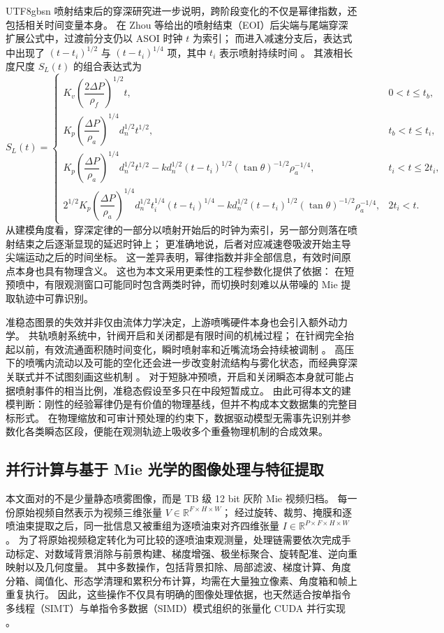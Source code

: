 \documentclass[english, 12pt, a4paper, elec, utf8, a-2b, online]{aaltothesis}
\begin{document}
\begin{CJK*}{UTF8}{gbsn}
喷射结束后的穿深研究进一步说明，跨阶段变化的不仅是幂律指数，还包括相关时间变量本身。
在 Zhou 等给出的喷射结束（EOI）后尖端与尾端穿深扩展公式中，过渡前分支仍以 ASOI 时钟 \(t\) 为索引；
而进入减速分支后，表达式中出现了 \((t-t_i)^{1/2}\) 与 \((t-t_i)^{1/4}\) 项，其中 \(t_i\) 表示喷射持续时间 \cite{ZhouLiLaiWei2019}。
其液相长度尺度 \(S_L(t)\) 的组合表达式为
\[
S_L(t)=
\begin{cases}
K_v \left( \dfrac{2\Delta P}{\rho_f} \right)^{1/2} t,
& 0 < t \le t_b,\\[6pt]
K_p \left( \dfrac{\Delta P}{\rho_a} \right)^{1/4} d_n^{1/2} t^{1/2},
& t_b < t \le t_i,\\[6pt]
K_p \left( \dfrac{\Delta P}{\rho_a} \right)^{1/4} d_n^{1/2} t^{1/2}
- k d_n^{1/2}(t-t_i)^{1/2}(\tan\theta)^{-1/2}\rho_a^{-1/4},
& t_i < t \le 2t_i,\\[6pt]
2^{1/2} K_p \left( \dfrac{\Delta P}{\rho_a} \right)^{1/4} d_n^{1/2} t_i^{1/4}(t-t_i)^{1/4}
- k d_n^{1/2}(t-t_i)^{1/2}(\tan\theta)^{-1/2}\rho_a^{-1/4},
& 2t_i < t.
\end{cases}
\]
从建模角度看，穿深定律的一部分以喷射开始后的时钟为索引，另一部分则落在喷射结束之后逐渐显现的延迟时钟上；
更准确地说，后者对应减速卷吸波开始主导尖端运动之后的时间坐标。
这一差异表明，幂律指数并非全部信息，有效时间原点本身也具有物理含义。
这也为本文采用更柔性的工程参数化提供了依据：
在短预喷中，有限观测窗口可能同时包含两类时钟，而切换时刻难以从带噪的 Mie 提取轨迹中可靠识别。

准稳态图景的失效并非仅由流体力学决定，上游喷嘴硬件本身也会引入额外动力学。
共轨喷射系统中，针阀开启和关闭都是有限时间的机械过程；
在针阀完全抬起以前，有效流通面积随时间变化，瞬时喷射率和近嘴流场会持续被调制
\cite{StumppRicco1996,HiroyasuArai1990}。
高压下的喷嘴内流动以及可能的空化还会进一步改变射流结构与雾化状态，而经典穿深关联式并不试图刻画这些机制
\cite{liu2020sprayreview}。
对于短脉冲预喷，开启和关闭瞬态本身就可能占据喷射事件的相当比例，准稳态假设至多只在中段短暂成立。
由此可得本文的建模判断：刚性的经验幂律仍是有价值的物理基线，但并不构成本文数据集的完整目标形式。
在物理缩放和可审计预处理的约束下，数据驱动模型无需事先识别并参数化各类瞬态区段，便能在观测轨迹上吸收多个重叠物理机制的合成效果。

\subsection{并行计算与基于 Mie 光学的图像处理与特征提取}

本文面对的不是少量静态喷雾图像，而是 TB 级 12 bit 灰阶 Mie 视频归档。
每一份原始视频自然表示为视频三维张量 \(V\in\mathbb{R}^{F\times H\times W}\)；
经过旋转、裁剪、掩膜和逐喷油束提取之后，同一批信息又被重组为逐喷油束对齐四维张量 \(I\in\mathbb{R}^{P\times F\times H\times W}\)。
为了将原始视频稳定转化为可比较的逐喷油束观测量，处理链需要依次完成手动标定、对数域背景消除与前景构建、梯度增强、极坐标聚合、旋转配准、逆向重映射以及几何度量。
其中多数操作，包括背景扣除、局部滤波、梯度计算、角度分箱、阈值化、形态学清理和累积分布计算，均需在大量独立像素、角度箱和帧上重复执行。
因此，这些操作不仅具有明确的图像处理依据，也天然适合按单指令多线程（SIMT）与单指令多数据（SIMD）模式组织的张量化 CUDA 并行实现 \cite{NickollsBuckGarlandSkadron2008,GonzalezWoodsDIP,Szeliski2010Vision}。


\end{CJK*}
\end{document}
